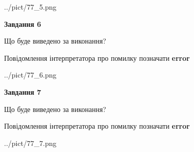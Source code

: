 \documentclass[10pt, ukrainian]{article}
\begin{document}
{\begin {large}
\begin{center}
	{../pict/77_5.png}
\end{center}
\newpage

{\begin {center}\textbf{Завдання 6}\end {center}}\par
Що буде виведено за виконання? \par
Повідомлення інтерпретатора про помилку позначати \textbf{error}

\begin{center}
	{../pict/77_6.png}
\end{center}
\newpage

{\begin {center}\textbf{Завдання 7}\end {center}}\par
Що буде виведено за виконання? \par
Повідомлення інтерпретатора про помилку позначати \textbf{error}

\begin{center}
	{../pict/77_7.png}
\end{center}
\newpage

\end {large}}
\end{document}
